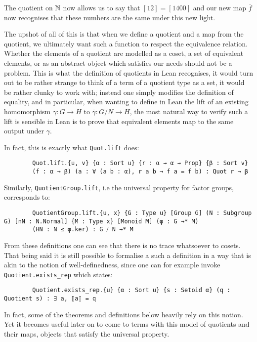 \begin{remark}
    The quotient on $\mathbb{N}$ now allows us to say that $[12] = [1400]$ and our new map $\bar{f}$ now recognises that these numbers are the same
    under this new light.

    The upshot of all of this is that when we define a quotient and a map from the quotient, we ultimately want such a function to respect the equivalence relation. Whether the elements of a quotient are
    modelled as a coset, a set of equivalent elements, or as an abstract object which satisfies our needs should not be a problem. 
    This is what the definition of quotients in Lean recognises, it would turn out to be rather strange to think of a term of a quotient type as a set, it would be rather clunky to work with; instead
    one simply modifies the definition of equality, and in particular, when wanting to define in Lean the lift of an existing homomorphism $\gamma : G \rightarrow H$
    to $\bar{\gamma} : G/N \rightarrow H$, the most natural way to verify such a lift is sensible in Lean is to prove that equivalent elements map to the same output under $\gamma$.

    In fact, this is exactly what \texttt{Quot.lift} does:

    \begin{footnotesize}
    \begin{verbatim}
        Quot.lift.{u, v} {α : Sort u} {r : α → α → Prop} {β : Sort v} 
        (f : α → β) (a : ∀ (a b : α), r a b → f a = f b) : Quot r → β
    \end{verbatim}
    \end{footnotesize}

    Similarly, \texttt{QuotientGroup.lift}, i.e the universal property for factor groups, corresponds to:

    \begin{footnotesize}
    \begin{verbatim}
        QuotientGroup.lift.{u, x} {G : Type u} [Group G] (N : Subgroup G) [nN : N.Normal] {M : Type x} [Monoid M] (φ : G →* M)
        (HN : N ≤ φ.ker) : G ⧸ N →* M
    \end{verbatim}
    \end{footnotesize}

    From these definitions one can see that there is no trace whatsoever to cosets. That being said it is still possible to formalise a such a definition in a way that is akin to the notion of well-definedness, 
    since one can for example invoke \texttt{Quotient.exists_rep} which states:

    \begin{footnotesize}
    \begin{verbatim}
        Quotient.exists_rep.{u} {α : Sort u} {s : Setoid α} (q : Quotient s) : ∃ a, ⟦a⟧ = q
    \end{verbatim}
    \end{footnotesize}    
    
    In fact, some of the theorems and definitions below heavily rely on this notion. Yet it becomes useful later on to come to terms with this model of quotients and their maps, objects that satisfy the universal property.
    \end{remark}

